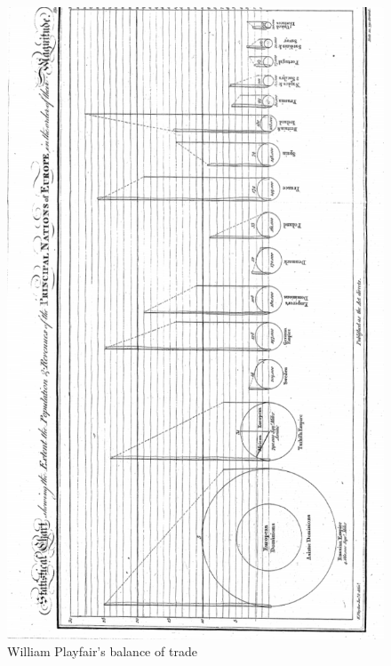 \documentclass[print]{nuthesis}
\begin{document}
\begin{figure}[tbp]

{\centering \includegraphics[width=0.85\linewidth,]{images/william-playfair-balance-trade} 

}

\caption{William Playfair's balance of trade}\label{fig:william-playfair-trade}
\end{figure}
\end{document}
